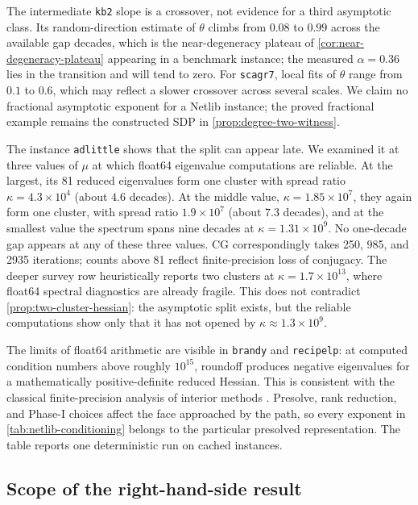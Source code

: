 The intermediate \texttt{kb2} slope is a crossover, not evidence for a
third asymptotic class.  Its random-direction estimate of $\theta$ climbs from
$0.08$ to $0.99$ across the available gap decades, which is the
near-degeneracy plateau of \cref{cor:near-degeneracy-plateau} appearing in a
benchmark instance; the measured $\alpha=0.36$ lies in the transition and will
tend to zero.  For \texttt{scagr7}, local fits of $\theta$ range from $0.1$ to
$0.6$, which may reflect a slower crossover across several scales.  We
claim no fractional asymptotic exponent for a Netlib instance; the proved
fractional example remains the constructed SDP in
\cref{prop:degree-two-witness}.

The instance \texttt{adlittle} shows that the split can appear late.  We
examined it at three values of $\mu$ at which float64 eigenvalue
computations are reliable.  At the largest, its 81 reduced eigenvalues form
one cluster with spread ratio $\kappa=4.3\times10^4$ (about $4.6$ decades).
At the middle value, $\kappa=1.85\times10^7$, they again form one cluster,
with spread ratio $1.9\times10^7$ (about $7.3$ decades), and at the smallest
value the spectrum spans nine decades at $\kappa=1.31\times10^9$.  No
one-decade gap appears at any of these three values.  CG correspondingly
takes 250, 985, and 2935 iterations; counts above 81 reflect finite-precision
loss of conjugacy.  The deeper survey row heuristically reports two clusters
at $\kappa=1.7\times10^{13}$, where float64 spectral diagnostics are already
fragile.  This does not contradict \cref{prop:two-cluster-hessian}: the
asymptotic split exists, but the reliable computations show only that it has
not opened by $\kappa\approx1.3\times10^9$.

The limits of float64 arithmetic are visible in \texttt{brandy} and
\texttt{recipelp}: at
computed condition numbers above roughly $10^{15}$, roundoff produces
negative eigenvalues for a mathematically positive-definite reduced Hessian.
This is consistent with the classical finite-precision analysis of interior
methods \cite{wright1998-ill-conditioning-computational-error-interior}.
Presolve, rank reduction, and Phase-I choices affect the face approached by
the path, so every exponent in \cref{tab:netlib-conditioning} belongs to the
particular presolved representation.  The table reports one deterministic
run on cached instances.

\subsection{Scope of the right-hand-side result}
\label{sec:spectra-scope}


